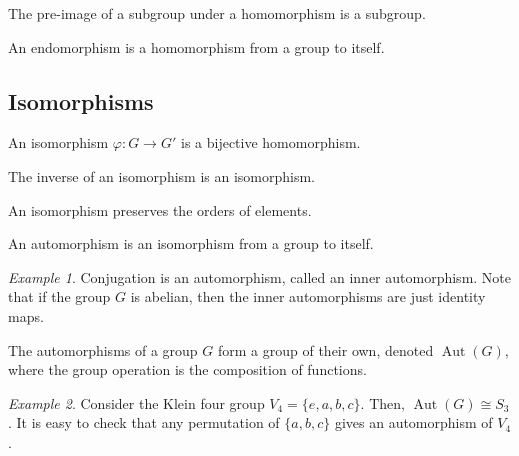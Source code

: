 \documentclass[11pt]{article}
\newcommand{\aut}{\operatorname{Aut}}
\theoremstyle{definition}
\theoremstyle{remark}
\newtheorem*{example}{Example}
\numberwithin{equation}{section}
\begin{document}
    \begin{lemma}
        The pre-image of a subgroup under a homomorphism is a subgroup.
    \end{lemma}

    \begin{definition}
        An endomorphism is a homomorphism from a group to itself.
    \end{definition}

    \subsection{Isomorphisms}
    \begin{definition}
        An isomorphism $\varphi\colon G \to G'$ is a bijective homomorphism.
    \end{definition}

    \begin{lemma}
        The inverse of an isomorphism is an isomorphism.
    \end{lemma}

    \begin{lemma}
        An isomorphism preserves the orders of elements.
    \end{lemma}

    \begin{definition}
        An automorphism is an isomorphism from a group to itself.
    \end{definition}

    \begin{example}
        Conjugation is an automorphism, called an inner automorphism. Note that if
        the group $G$ is abelian, then the inner automorphisms are just identity maps.
    \end{example}

    \begin{lemma}
        The automorphisms of a group $G$ form a group of their own, denoted
        $\aut(G)$, where the group operation is the composition of functions.
    \end{lemma}

    \begin{example}
        Consider the Klein four group $V_4 = \{e, a, b, c\}$. Then, $\aut(G) \cong
        S_3$. It is easy to check that any permutation of $\{a, b, c\}$ gives an
        automorphism of $V_4$.
    \end{example}
    
\end{document}
